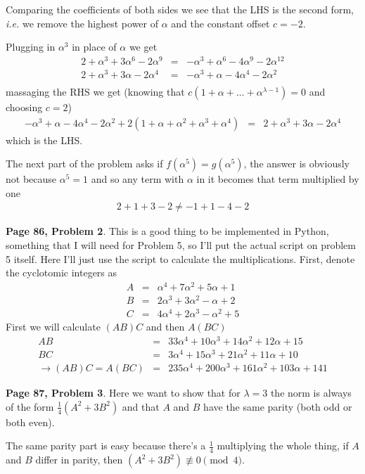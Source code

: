 \documentclass[aps,preprint,preprintnumbers,nofootinbib,showpacs,prd]{revtex4-1}
\newcommand{\ie}{{\it i.e.} }
\newcommand{\nbea}{\begin{eqnarray*}}
\newcommand{\neea}{\end{eqnarray*}}
\begin{document}
Comparing the coefficients of both sides we see that the LHS is the second form, \ie we remove the highest power of $\alpha$ and the constant offset $c = -2$.

Plugging in $\alpha^3$ in place of $\alpha$ we get
%
\nbea
2 + \alpha^3 + 3\alpha^6 - 2\alpha^9 & = & -\alpha^3 + \alpha^6 - 4\alpha^9 - 2\alpha^{12} \\
2 + \alpha^3 + 3\alpha - 2\alpha^4 & = & -\alpha^3 + \alpha - 4\alpha^4 - 2\alpha^{2} \\
\neea
%
massaging the RHS we get (knowing that $c(1 + \alpha + \dots + \alpha^{\lambda-1}) = 0$ and choosing $c = 2$)
%
\nbea
-\alpha^3 + \alpha - 4\alpha^4 - 2\alpha^{2} + 2(1 + \alpha + \alpha^2 + \alpha^3 + \alpha^4) & = & 2 + \alpha^3 + 3\alpha - 2\alpha^4
\neea
%
which is the LHS.

The next part of the problem asks if $f(\alpha^5) = g(\alpha^5)$, the answer is obviously not because $\alpha^5 = 1$ and so any term with $\alpha$ in it becomes that term multiplied by one
%
\nbea
2 + 1 + 3 - 2 \neq -1 + 1 - 4 - 2
\neea
%

{\bf Page 86, Problem 2}. This is a good thing to be implemented in Python, something that I will need for Problem 5, so I'll put the actual script on problem 5 itself. Here I'll just use the script to calculate the multiplications. First, denote the cyclotomic integers as
%
\nbea
A & = & \alpha^4 + 7\alpha^2 + 5\alpha + 1 \\
B & = & 2\alpha^3 + 3\alpha^2 - \alpha + 2 \\
C & = & 4\alpha^4 + 2\alpha^3 - \alpha^2 + 5 
\neea
%
First we will calculate $(AB)C$ and then $A(BC)$
%
\nbea
AB & = & 33\alpha^4 + 10 \alpha^3 + 14\alpha^2 + 12\alpha + 15 \\
BC & = & 3\alpha^4 + 15\alpha^3 + 21\alpha^2 + 11\alpha + 10 \\
\to (AB)C = A(BC) & = & 235\alpha^4 + 200\alpha^3 + 161\alpha^2 + 103\alpha + 141
\neea
%

{\bf Page 87, Problem 3}. Here we want to show that for $\lambda = 3$ the norm is always of the form $\frac{1}{4}(A^2 + 3B^2)$ and that $A$ and $B$ have the same parity (both odd or both even).

The same parity part is easy because there's a $\frac{1}{4}$ multiplying the whole thing, if $A$ and $B$ differ in parity, then $(A^2 + 3B^2) \not\equiv 0 \pmod{4}$.
\end{document}
